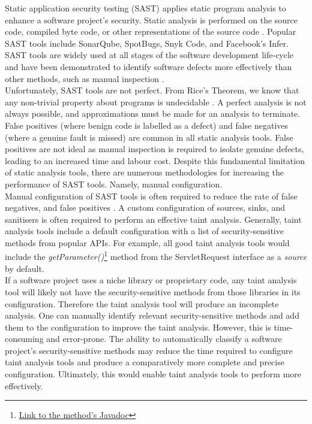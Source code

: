 \noindent
Static application security testing (SAST) applies static program analysis to enhance a software project's security. Static analysis is performed on the source code, compiled byte code, or other representations of the source code \cite{principles_program_analysis}. Popular SAST tools include SonarQube, SpotBugs, Snyk Code, and Facebook's Infer. SAST tools are widely used at all stages of the software development life-cycle and have been demonstrated to identify software defects more effectively than other methods, such as manual inspection \cite{costs_static_analysis}.\\

\noindent
Unfortunately, SAST tools are not perfect. From Rice's Theorem, we know that any non-trivial property about programs is undecidable \cite{moller2012static}. A perfect analysis is not always possible, and approximations must be made for an analysis to terminate. False positives (where benign code is labelled as a defect) and false negatives (where a genuine fault is missed) \cite{chess2004static} are common in all static analysis tools. False positives are not ideal as manual inspection is required to isolate genuine defects, leading to an increased time and labour cost. Despite this fundamental limitation of static analysis tools, there are numerous methodologies for increasing the performance of SAST tools. Namely, manual configuration. \\

\noindent
Manual configuration of SAST tools is often required to reduce the rate of false negatives, and false positives \cite{ZampettiFiorella2017HOSP}. A custom configuration of sources, sinks, and sanitisers is often required to perform an effective taint analysis. Generally, taint analysis tools include a default configuration with a list of security-sensitive methods from popular APIs. For example, all good taint analysis tools would include the \emph{getParameter()}\footnote{\href{https://docs.oracle.com/javaee/6/api/javax/servlet/ServletRequest.html\#getParameter(java.lang.String)}{Link to the method's Javadoc}} method from the ServletRequest interface as a \emph{source} by default.\\

\noindent
If a software project uses a niche library or proprietary code, any taint analysis tool will likely not have the security-sensitive methods from those libraries in its configuration. Therefore the taint analysis tool will produce an incomplete analysis. One can manually identify relevant security-sensitive methods and add them to the configuration to improve the taint analysis. However, this is time-consuming and error-prone. The ability to automatically classify a software project's security-sensitive methods may reduce the time required to configure taint analysis tools and produce a comparatively more complete and precise configuration. Ultimately, this would enable taint analysis tools to perform more effectively. \\

